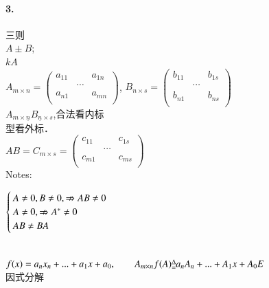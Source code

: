 \documentclass[printbox]{BHCexam}
\begin{document}
\paragraph{3.}三则\\
$A \pm B$;\\
$kA$\\
$A_{m \times n} =
\left(                 %
\begin{array}{ccc}   %
  a_{11} &  & a_{1n} \\  %
  & \cdots & \\  %
a_{n1}& & a_{mn}\\ 
\end{array}
\right)$,                 %
$B_{n \times s} =
\left(                 %
\begin{array}{ccc}   %
  b_{11} &  & b_{1s} \\  %
  & \cdots & \\  %
b_{n1}& & b_{ns}\\ 
\end{array}
\right)$   \\              %

$A_{m \times \underline{n}}B_{\underline{n} \times s} $,合法看内标\\
型看外标．\\
$AB= C_{m \times s} =
\left(                 %
\begin{array}{ccc}   %
  c_{11} &  & c_{1s} \\  %
  & \cdots & \\  %
c_{m1}& & c_{ms}\\ 
\end{array}
\right)$   \\              %

Notes:

$\begin{cases}
  A \neq 0,B \neq 0, \nRightarrow AB \neq 0 \\
  A \neq 0, \nRightarrow  A^{*} \neq 0 \\
  AB \neq BA 
\end{cases} \\
$

\\
$f(x)= a_nx_n+...+a_1x+a_0, \qquad A_{m \times n }\\
f(A)\substack{\Delta \\=} a_nA_n+...+A_1x+A_0E
$\\因式分解
\end{document}
